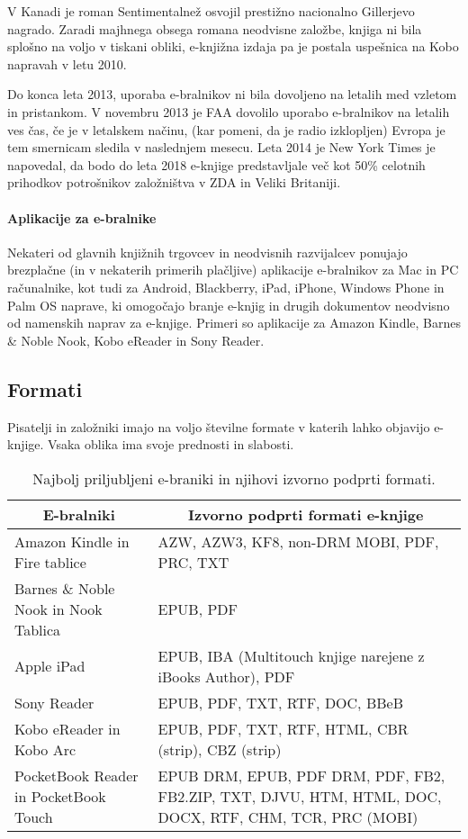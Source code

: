 \documentclass[a4paper, 12pt]{book}
\begin{document}
V Kanadi je roman Sentimentalnež osvojil prestižno nacionalno Gillerjevo nagrado. Zaradi majhnega obsega romana neodvisne založbe, knjiga ni bila splošno na voljo v tiskani obliki, e-knjižna izdaja pa je postala uspešnica na Kobo napravah v letu 2010. \cite{28}

Do konca leta 2013, uporaba e-bralnikov ni bila dovoljeno na letalih med vzletom in pristankom. \cite{29} V novembru 2013 je FAA dovolilo uporabo e-bralnikov na letalih ves čas, če je v letalskem načinu, (kar pomeni, da je radio izklopljen) Evropa je tem smernicam sledila v naslednjem mesecu. \cite{30} Leta 2014 je New York Times je napovedal, da bodo do leta 2018 e-knjige predstavljale več kot 50\% celotnih prihodkov potrošnikov založništva v ZDA in Veliki Britaniji. \cite{31}

\paragraph{Aplikacije za e-bralnike}
Nekateri od glavnih knjižnih trgovcev in neodvisnih razvijalcev ponujajo brezplačne (in v nekaterih primerih plačljive) aplikacije e-bralnikov za Mac in PC računalnike, kot tudi za Android, Blackberry, iPad, iPhone, Windows Phone in Palm OS naprave, ki omogočajo branje e-knjig in drugih dokumentov neodvisno od namenskih naprav za e-knjige. Primeri so aplikacije za Amazon Kindle, Barnes \& Noble Nook, Kobo eReader in Sony Reader. 

\subsection{Formati}
\label{eknjiga_formati}
Pisatelji in založniki imajo na voljo številne formate v katerih lahko objavijo e-knjige. Vsaka oblika ima svoje prednosti in slabosti.
\begin{table}[h]
	\begin{center}
		\begin{tabular}{ |p{5.5cm} | p{7.5cm}| }
			\hline
			\multicolumn{1}{|c|}{\textbf{E-bralniki}} & \multicolumn{1}{|c|}{\textbf{Izvorno podprti formati e-knjige}} \\ \hline
			Amazon Kindle in Fire tablice\cite{33} & AZW, AZW3, KF8, non-DRM MOBI, PDF, PRC, TXT \\ \hline
			Barnes \& Noble Nook in Nook Tablica\cite{34} & EPUB, PDF \\  \hline
			Apple iPad\cite{35} & EPUB, IBA (Multitouch knjige narejene z iBooks Author), PDF \\ \hline
			Sony Reader\cite{33} & EPUB, PDF, TXT, RTF, DOC, BBeB \\ \hline
			Kobo eReader in Kobo Arc\cite{36}\cite{37} & EPUB, PDF, TXT, RTF, HTML, CBR (strip), CBZ (strip) \\ \hline
			PocketBook Reader in PocketBook Touch\cite{38}\cite{39} & EPUB DRM, EPUB, PDF DRM, PDF, FB2, FB2.ZIP, TXT, DJVU, HTM, HTML, DOC, DOCX, RTF, CHM, TCR, PRC (MOBI) \\
			\hline
		\end{tabular}
	\end{center}
		\caption{Najbolj priljubljeni e-braniki \cite{32} in njihovi izvorno podprti formati.}
		\label{tbl:bralniki}
\end{table}
\end{document}
